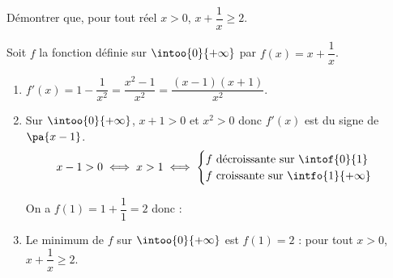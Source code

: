 \begin{methode}
	Démontrer que, pour tout réel $x > 0$, $x + \dfrac{1}{x} \geq 2$.

	\begin{correction}
		Soit $f$ la fonction définie sur $\intoo{0}{+\infty}$ par $f(x) = x + \dfrac{1}{x}$.
		\begin{enumerate}
			\item $f'(x) = 1 - \dfrac{1}{x^2} = \dfrac{x^2 - 1}{x^2} = \dfrac{(x - 1)(x + 1)}{x^2}$.
			\item Sur $\intoo{0}{+\infty}$, $x + 1 > 0$ et $x^2 > 0$ donc $f'(x)$ est du signe de $\pa{x - 1}$.
			      \[
				      x-1 > 0\iff x>1 \iff \begin{cases}f~\text{décroissante sur }\intof{0}{1}\\f~\text{croissante sur }\intfo{1}{+\infty}\end{cases}
			      \]

			      On a $f(1) = 1 + \dfrac{1}{1} = 2$ donc :

			      \ms

			      \begin{center}
			      \end{center}

			\item Le minimum de $f$ sur $\intoo{0}{+\infty}$ est $f(1) = 2$ : pour tout $x > 0$, $x + \dfrac{1}{x} \geq 2$.
		\end{enumerate}
	\end{correction}
\end{methode}

